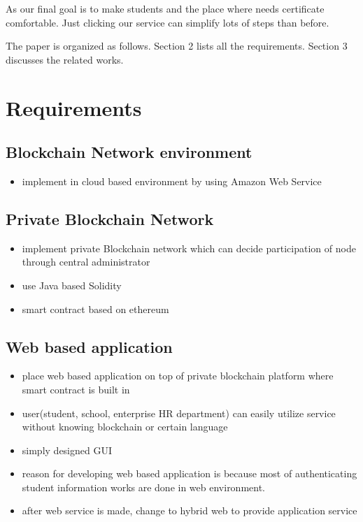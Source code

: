 \documentclass[conference]{IEEEtran}
\begin{document}
As our final goal is to make students and the place where needs certificate comfortable. Just clicking our service can simplify lots of steps than before.

The paper is organized as follows. Section 2 lists all the requirements. Section 3 discusses the related works. 

\section{Requirements}

\subsection{Blockchain Network environment}
\begin{itemize}
\item implement in cloud based environment by using Amazon Web Service
\end{itemize}

\subsection{Private Blockchain Network}
\begin{itemize}
\item implement private Blockchain network which can decide participation of node through central administrator
\item use Java based Solidity 
\item smart contract based on ethereum
\end{itemize}

\subsection{Web based application}
\begin{itemize}
\item place web based application on top of private blockchain platform where smart contract is built in
\item user(student, school, enterprise HR department) can easily utilize service without knowing blockchain or certain language
\item simply designed GUI
\item reason for developing web based application is because most of authenticating student information works are done in web environment. 
\item after web service is made, change to hybrid web to provide application service 
\end{itemize}
\end{document}
